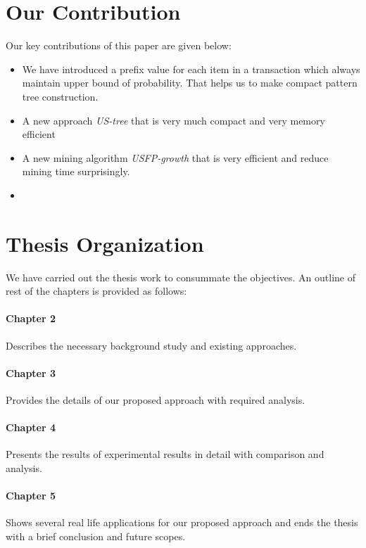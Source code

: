 \section{Our Contribution}
Our key contributions of this paper are given below:
\begin{itemize}
\item We have introduced a prefix value for each item in a transaction which always maintain upper bound of probability. That helps us to make compact pattern tree construction.
\item A new approach \emph{US-tree} that is very much compact and very memory efficient
\item A new mining algorithm \emph{USFP-growth} that is very efficient and reduce mining time surprisingly.
\item 
\end{itemize}


\section{Thesis Organization}
We have carried out the thesis work to consummate the objectives. An outline of rest of the chapters is provided as follows:
\paragraph{Chapter 2}
Describes the necessary background study and existing approaches.
\paragraph{Chapter 3}
Provides the details of our proposed approach with required analysis.
\paragraph{Chapter 4}
Presents the results of experimental results in detail with comparison and analysis.
\paragraph{Chapter 5}
Shows several real life applications for our proposed approach and ends the thesis with a brief conclusion and future scopes.
%